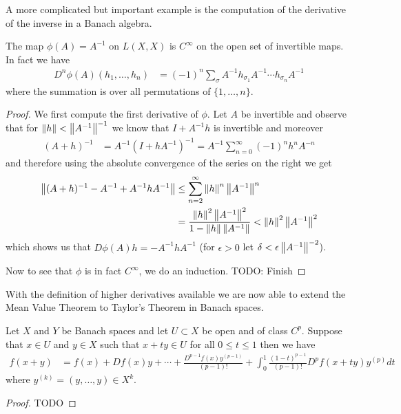 A more complicated but important example is the computation of the
derivative of the inverse in a Banach algebra.
\begin{prop}\label{FrechetDerivativeOfInverse}The map $\phi(A) = A^{-1}$ on $L(X,X)$ is $C^\infty$ on the open set of
  invertible maps.  In fact we have
\begin{align*}
D^n\phi(A)(h_1, \dotsc, h_n) &= (-1)^n\sum_\sigma A^{-1} h_{\sigma_1}
                               A^{-1} \dotsm h_{\sigma_n} A^{-1}
\end{align*}
where the summation is over all permutations of $\lbrace 1, \dotsc, n \rbrace$.
\end{prop}
\begin{proof}
We first compute the first derivative of $\phi$.  Let $A$ be invertible and
observe that for $\left \lVert h \right \rVert < \left \lVert A^{-1} \right \rVert^{-1}$ we know that $I +
A^{-1} h$ is invertible and moreover
\begin{align*}
(A + h)^{-1} &= A^{-1} (I + h A^{-1})^{-1} = A^{-1} \sum_{n=0}^\infty
              (-1)^n h^n A^{-n}
\end{align*}
and therefore using the absolute convergence of the series on the
right we get
\begin{align*}
\left \lVert (A + h)^{-1} - A^{-1} + A^{-1} h A^{-1} \right \rVert &\leq \sum_{n=2}^\infty
                                                 \left \lVert h \right \rVert^n
                                                 \left \lVert A^{-1} \right \rVert^n \\
&= \frac{\left \lVert h \right \rVert^2\left \lVert A^{-1} \right \rVert^2}{1 - \left \lVert h \right \rVert\left \lVert A^{-1} \right \rVert} < \left \lVert h \right \rVert^2\left \lVert A^{-1} \right \rVert^2
\end{align*}
which shows us that $D\phi(A)h = -A^{-1} h A^{-1}$ (for $\epsilon > 0$
let $\delta < \epsilon \left \lVert A^{-1} \right \rVert^{-2}$).

Now to see that $\phi$ is in fact $C^{\infty}$, we do an induction.
TODO: Finish
\end{proof}

With the definition of higher derivatives available we are now able to
extend the Mean Value Theorem to Taylor's Theorem in Banach spaces.  
\begin{thm}\label{TaylorsTheoremBanachSpaces}Let $X$
  and $Y$ be Banach spaces and let $U \subset X$ be open and of class
  $C^p$.  Suppose that $x \in U$ and $y \in X$ such that $x + ty \in
  U$ for all $0 \leq t \leq 1$ then we have
\begin{align*}
f(x+y) &= f(x) + Df(x) y + \dotsm + \frac{D^{p-1}f(x)
         y^{(p-1)}}{(p-1)!} + \int_0^1 \frac{(1-t)^{p-1}}{(p-1)!}
         D^pf(x + ty) y^{(p)} dt
\end{align*}
where $y^{(k)} = (y, \dotsc, y) \in X^k$.
\end{thm}
\begin{proof}
TODO
\end{proof}

